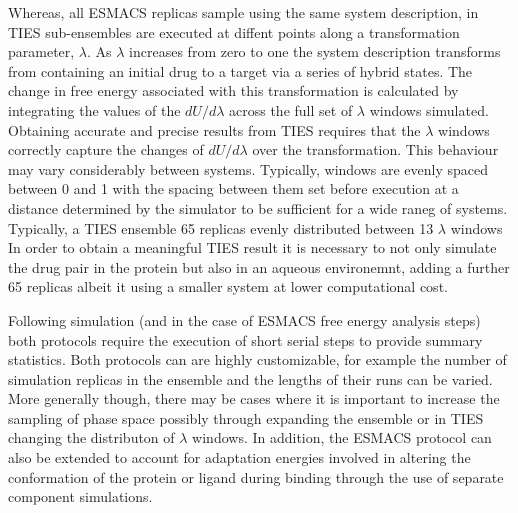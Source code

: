 Whereas, all ESMACS replicas sample using the same system description, in TIES sub-ensembles are executed 
at diffent points along a transformation parameter, $\lambda$.
As $\lambda$ increases from zero to one the system description transforms from containing an 
initial drug to a target via a series of hybrid states.
The change in free energy associated with this transformation is calculated by integrating the 
values of the $dU/d\lambda$ across the full set of $\lambda$ windows simulated.
Obtaining accurate and precise results from TIES requires that the $\lambda$ windows correctly 
capture the changes of $dU/d\lambda$ over the transformation.
This behaviour may vary considerably between systems.
Typically, windows are evenly spaced between 0 and 1 with the spacing between them set before 
execution at a distance determined by the simulator to be sufficient for a wide raneg of systems. 
Typically, a TIES ensemble 65 replicas evenly distributed between 13 $\lambda$ windows
In order to obtain a meaningful TIES result it is necessary to not only simulate the drug pair 
in the protein but also in an aqueous environemnt, adding a further 65 replicas albeit it using a
smaller system at lower computational cost.

Following simulation (and in the case of ESMACS free energy analysis steps) both protocols require
the execution of short serial steps to provide summary statistics.
Both protocols can are highly customizable, for example the number of simulation replicas in the 
ensemble and the lengths of their runs can be varied.
More generally though, there may be cases where it is important to increase the sampling of phase 
space possibly through expanding the ensemble or in TIES changing the distributon of $\lambda$ 
windows.
In addition, the ESMACS protocol can also be extended to account for adaptation energies involved 
in altering the conformation of the protein or ligand during binding through the use of separate 
component simulations.


